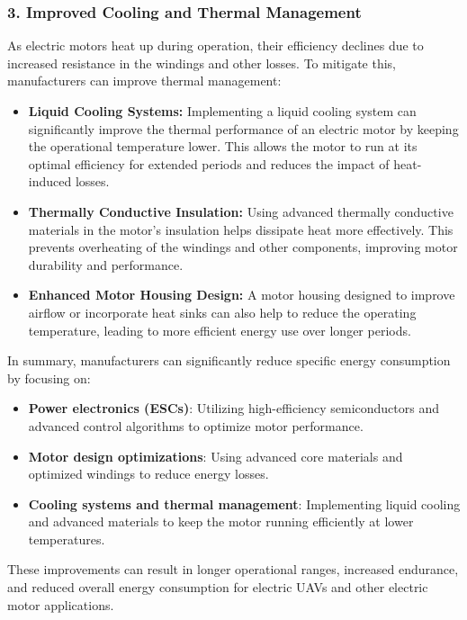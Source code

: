 \documentclass[12pt]{article}
\begin{document}
		\subsubsection{3. Improved Cooling and Thermal Management}
		
		As electric motors heat up during operation, their efficiency declines due to increased resistance in the windings and other losses. To mitigate this, manufacturers can improve thermal management:
		
		\begin{itemize}
			\item \textbf{Liquid Cooling Systems:}
			Implementing a liquid cooling system can significantly improve the thermal performance of an electric motor by keeping the operational temperature lower. This allows the motor to run at its optimal efficiency for extended periods and reduces the impact of heat-induced losses.
			
			\item \textbf{Thermally Conductive Insulation:}
			Using advanced thermally conductive materials in the motor's insulation helps dissipate heat more effectively. This prevents overheating of the windings and other components, improving motor durability and performance.
			
			\item \textbf{Enhanced Motor Housing Design:}
			A motor housing designed to improve airflow or incorporate heat sinks can also help to reduce the operating temperature, leading to more efficient energy use over longer periods.
		\end{itemize}
		
		
		In summary, manufacturers can significantly reduce specific energy consumption by focusing on:
		\begin{itemize}
			\item \textbf{Power electronics (ESCs)}: Utilizing high-efficiency semiconductors and advanced control algorithms to optimize motor performance.
			\item \textbf{Motor design optimizations}: Using advanced core materials and optimized windings to reduce energy losses.
			\item \textbf{Cooling systems and thermal management}: Implementing liquid cooling and advanced materials to keep the motor running efficiently at lower temperatures.
		\end{itemize}
		These improvements can result in longer operational ranges, increased endurance, and reduced overall energy consumption for electric UAVs and other electric motor applications.
		
\end{document}

